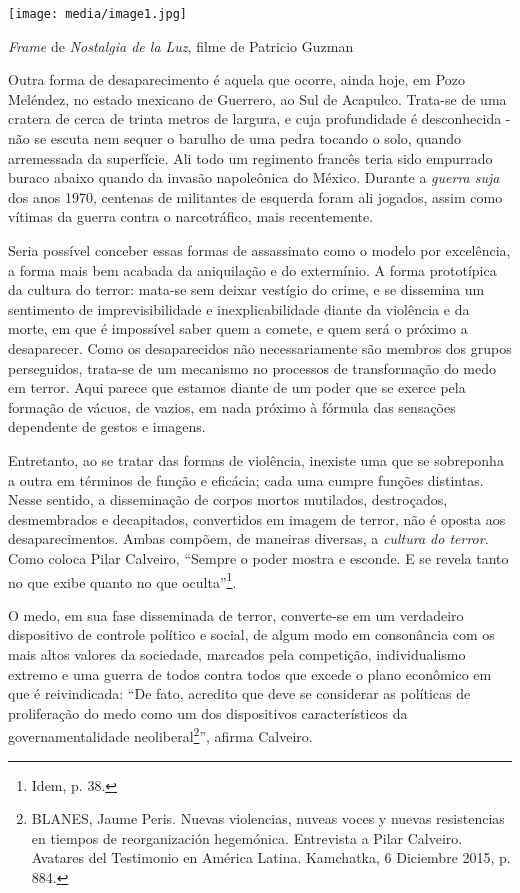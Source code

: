 \texttt{[image: media/image1.jpg]}

\emph{Frame} de \emph{Nostalgia de la Luz}, filme de Patricio Guzman

Outra forma de desaparecimento é aquela que ocorre, ainda hoje, em Pozo
Meléndez, no estado mexicano de Guerrero, ao Sul de Acapulco. Trata-se
de uma cratera de cerca de trinta metros de largura, e cuja profundidade
é desconhecida - não se escuta nem sequer o barulho de uma pedra tocando
o solo, quando arremessada da superfície. Ali todo um regimento francês
teria sido empurrado buraco abaixo quando da invasão napoleônica do
México. Durante a \emph{guerra suja} dos anos 1970, centenas de
militantes de esquerda foram ali jogados, assim como vítimas da guerra
contra o narcotráfico, mais recentemente.

Seria possível conceber essas formas de assassinato como o modelo por
excelência, a forma mais bem acabada da aniquilação e do extermínio. A
forma prototípica da cultura do terror: mata-se sem deixar vestígio do
crime, e se dissemina um sentimento de imprevisibilidade e
inexplicabilidade diante da violência e da morte, em que é impossível
saber quem a comete, e quem será o próximo a desaparecer. Como os
desaparecidos não necessariamente são membros dos grupos perseguidos,
trata-se de um mecanismo no processos de transformação do medo em
terror. Aqui parece que estamos diante de um poder que se exerce pela
formação de vácuos, de vazios, em nada próximo à fórmula das sensações
dependente de gestos e imagens.

Entretanto, ao se tratar das formas de violência, inexiste uma que se
sobreponha a outra em términos de função e eficácia; cada uma cumpre
funções distintas. Nesse sentido, a disseminação de corpos mortos
mutilados, destroçados, desmembrados e decapitados, convertidos em
imagem de terror, não é oposta aos desaparecimentos. Ambas compõem, de
maneiras diversas, a \emph{cultura do terror}. Como coloca Pilar
Calveiro, ``Sempre o poder mostra e esconde. E se revela tanto no que
exibe quanto no que oculta''\footnote{Idem, p. 38.}.

O medo, em sua fase disseminada de terror, converte-se em um verdadeiro
dispositivo de controle político e social, de algum modo em consonância
com os mais altos valores da sociedade, marcados pela competição,
individualismo extremo e uma guerra de todos contra todos que excede o
plano econômico em que é reivindicada: ``De fato, acredito que deve se
considerar as políticas de proliferação do medo como um dos dispositivos
característicos da governamentalidade neoliberal\footnote{BLANES, Jaume
  Peris. Nuevas violencias, nuveas voces y nuevas resistencias en
  tiempos de reorganización hegemónica. Entrevista a Pilar Calveiro.
  Avatares del Testimonio en América Latina. Kamchatka, 6 Diciembre
  2015, p. 884.}'', afirma Calveiro.

